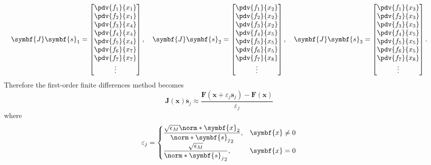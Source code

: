\documentclass{article}
\begin{document}
\begin{equation*}
    \symbf{J}\symbf{s}_1 =
    \begin{bmatrix}
        \pdv{f_1}{x_1} \\
        \pdv{f_2}{x_1} \\
        \pdv{f_3}{x_4} \\
        \pdv{f_4}{x_4} \\
        \pdv{f_5}{x_4} \\
        \pdv{f_6}{x_7} \\
        \pdv{f_7}{x_7} \\
        \vdots
    \end{bmatrix}
    , \quad
    \symbf{J}\symbf{s}_2 =
    \begin{bmatrix}
        \pdv{f_1}{x_2} \\
        \pdv{f_2}{x_2} \\
        \pdv{f_3}{x_2} \\
        \pdv{f_4}{x_5} \\
        \pdv{f_5}{x_5} \\
        \pdv{f_6}{x_5} \\
        \pdv{f_7}{x_8} \\
        \vdots
    \end{bmatrix}
    , \quad
    \symbf{J}\symbf{s}_3 =
    \begin{bmatrix}
        \pdv{f_1}{x_3} \\
        \pdv{f_2}{x_3} \\
        \pdv{f_3}{x_3} \\
        \pdv{f_4}{x_5} \\
        \pdv{f_5}{x_5} \\
        \pdv{f_6}{x_5} \\
        \pdv{f_7}{x_8} \\
        \vdots
    \end{bmatrix}
    .
\end{equation*}
Therefore the first-order finite differences method becomes
\begin{equation*}
    \symbf{J}\left( \symbf{x} \right) \symbf{s}_j \approx \frac{\symbf{F}\left( \symbf{x} + \varepsilon_j \symbf{s}_j \right) - \symbf{F}\left( \symbf{x} \right)}{\varepsilon_j}
\end{equation*}
where
\begin{equation*}
    \varepsilon_j =
    \begin{cases}
        \dfrac{\sqrt{\epsilon_M} \norm*{\symbf{x}}_2}{\norm*{\symbf{s}_j}_2}, & \symbf{x} \neq 0 \\
        \dfrac{\sqrt{\epsilon_M}}{\norm*{\symbf{s}_j}_2},                     & \symbf{x} = 0
    \end{cases}
\end{equation*}
\end{document}
